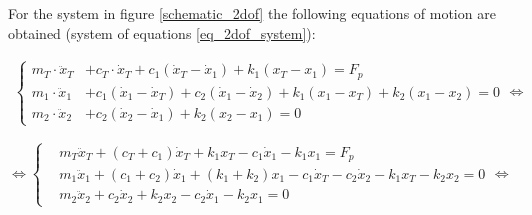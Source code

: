 \documentclass[  10pt, twoside]{report} %
\numberwithin{equation}{chapter}
\begin{document}
For the system in figure \ref{schematic_2dof} the following equations of motion are obtained (system of equations \eqref{eq_2dof_system}):

\begin{align}\label{eq_2dof_system}
\left\{
\begin{aligned}
    m_T \cdot \ddot{x}_T &+ c_T \cdot \dot{x}_T + c_1 (\dot{x}_T -  \dot{x}_1) + k_1 (x_T - x_1) = F_p \\
    m_1 \cdot \ddot{x}_1 &+ c_1 ( \dot{x}_1 -\dot{x}_T) + c_2 ( \dot{x}_1 - \dot{x}_2) + k_1 (x_1 - x_T) + k_2 (x_1 - x_2) = 0 \\
    m_2 \cdot \ddot{x}_2 &+ c_2 ( \dot{x}_2 -\dot{x}_1) + k_2 (x_2 - x_1) = 0
\end{aligned}
\right. 
\Longleftrightarrow
\end{align}


\begin{equation*} 
\Longleftrightarrow
\left\{
\begin{aligned}
    &m_T  \ddot{x}_T + (c_T + c_1)  \dot{x}_T + k_1 x_T - c_1  \dot{x}_1 - k_1  x_1 = F_p \\
    &m_1  \ddot{x}_1 + (c_1 + c_2) \dot{x}_1 + (k_1 + k_2) x_1 - c_1  \dot{x}_T - c_2  \dot{x}_2 - k_1  x_T - k_2 x_2 = 0 \\
    &m_2  \ddot{x}_2 + c_2 \dot{x}_2 + k_2 x_2 - c_2  \dot{x}_1 - k_2 x_1 = 0
\end{aligned}
\right.
\Longleftrightarrow
\end{equation*}

\end{document}
